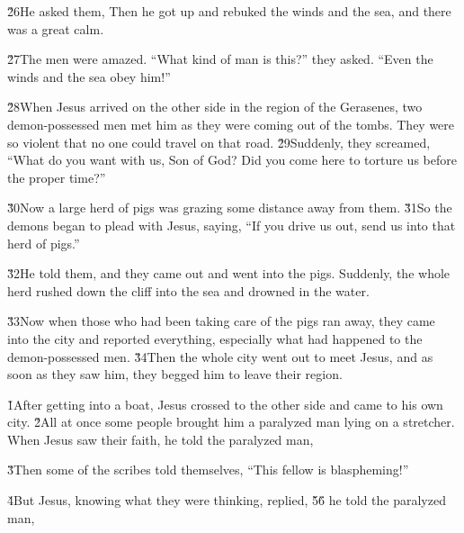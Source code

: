 \v{26}He asked them,  Then he got up and rebuked the winds and the sea, and there was a great calm.

\v{27}The men were amazed. ``What kind of man is this?'' they asked. ``Even the winds and the sea obey him!''

\v{28}When Jesus arrived on the other side in the region of the Gerasenes, two demon-possessed men met him as they were coming out of the tombs. They were so violent that no one could travel on that road. \v{29}Suddenly, they screamed, ``What do you want with us, Son of God? Did you come here to torture us before the proper time?''

\v{30}Now a large herd of pigs was grazing some distance away from them. \v{31}So the demons began to plead with Jesus, saying, ``If you drive us out, send us into that herd of pigs.''

\v{32}He told them,  and they came out and went into the pigs. Suddenly, the whole herd rushed down the cliff into the sea and drowned in the water.

\v{33}Now when those who had been taking care of the pigs ran away, they came into the city and reported everything, especially what had happened to the demon-possessed men. \v{34}Then the whole city went out to meet Jesus, and as soon as they saw him, they begged him to leave their region.

\v{1}After getting into a boat, Jesus crossed to the other side and came to his own city. \v{2}All at once some people brought him a paralyzed man lying on a stretcher. When Jesus saw their faith, he told the paralyzed man, 

\v{3}Then some of the scribes told themselves, ``This fellow is blaspheming!''

\v{4}But Jesus, knowing what they were thinking, replied,  \v{5}\red{,}\v{6} he told the paralyzed man, 

